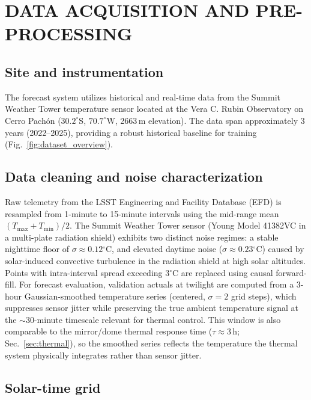 \documentclass[]{spie}  %
\newcommand{\degC}{$^{\circ}$C}
\begin{document}
\section{DATA ACQUISITION AND PRE-PROCESSING}
\label{sec:data}

\subsection{Site and instrumentation}
\label{sec:data:site}

The forecast system utilizes historical and real-time data from the Summit Weather Tower temperature sensor located at the Vera C. Rubin Observatory on Cerro Pach\'on ($30.2^\circ$S, $70.7^\circ$W, 2663\,m elevation). The data span approximately 3 years (2022--2025), providing a robust historical baseline for training (Fig.~\ref{fig:dataset_overview}).

\subsection{Data cleaning and noise characterization}
\label{sec:data:cleaning}

Raw telemetry from the LSST Engineering and Facility Database (EFD) is resampled from 1-minute to 15-minute intervals using the mid-range mean $(T_{\text{max}} + T_{\text{min}})/2$. The Summit Weather Tower sensor (Young Model 41382VC in a multi-plate radiation shield) exhibits two distinct noise regimes: a stable nighttime floor of $\sigma \approx 0.12$\degC{}, and elevated daytime noise ($\sigma \approx 0.23$\degC{}) caused by solar-induced convective turbulence in the radiation shield at high solar altitudes. Points with intra-interval spread exceeding 3\degC{} are replaced using causal forward-fill. For forecast evaluation, validation actuals at twilight are computed from a 3-hour Gaussian-smoothed temperature series (centered, $\sigma = 2$ grid steps), which suppresses sensor jitter while preserving the true ambient temperature signal at the $\sim$30-minute timescale relevant for thermal control. This window is also comparable to the mirror/dome thermal response time ($\tau \approx 3$\,h; Sec.~\ref{sec:thermal}), so the smoothed series reflects the temperature the thermal system physically integrates rather than sensor jitter.

\subsection{Solar-time grid}
\label{sec:data:solar_grid}
\end{document}

